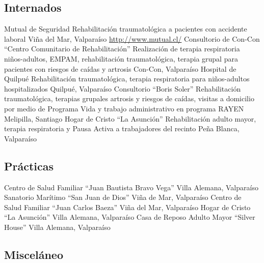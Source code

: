 \documentclass[11pt,a4paper,sans]{moderncv}
\begin{document}
\subsection{Internados}
        
        {Mutual de Seguridad}
        {Rehabilitación traumatológica a pacientes con accidente laboral}
        {}
        {Viña del Mar, Valparaíso}
        {\url{http://www.mutual.cl/}}
        {Consultorio de Con-Con ``Centro Comunitario de Rehabilitación''}
        {Realización de terapia respiratoria niños-adultos, EMPAM, rehabilitación traumatológica, terapia grupal para pacientes con riesgos de caídas y artrosis}
        {}
        {}
        {Con-Con, Valparaíso}
        {Hospital de Quilpué}
        {Rehabilitación traumatológica, terapia respiratoria para niños-adultos hospitalizados}
        {}
        {}
        {Quilpué, Valparaíso}
        {Consultorio ``Boris Soler''}
        {Rehabilitación traumatológica, terapias grupales artrosis y riesgos de caídas, visitas a domicilio por medio de Programa Vida y trabajo administrativo en programa RAYEN}
        {}
        {}
        {Melipilla, Santiago}
        {Hogar de Cristo ``La Asunción''}
        {Rehabilitación adulto mayor, terapia respiratoria y Pausa Activa a trabajadores del recinto}
        {}
        {}
        {Peña Blanca, Valparaíso}
        
\subsection{Prácticas}

\cventry{}
        {Centro de Salud Familiar ``Juan Bautista Bravo Vega''}
        {}
        {}
        {Villa Alemana, Valparaíso}
        {}
\cventry{}
        {Sanatorio Marítimo ``San Juan de Dios''}
        {}
        {}
        {Viña de Mar, Valparaíso}
        {}
\cventry{}
        {Centro de Salud Familiar ``Juan Carlos Baeza''}
        {}
        {}
        {Viña del Mar, Valparaíso}
        {}
\cventry{}
        {Hogar de Cristo ``La Asunción''}
        {}
        {}
        {Villa Alemana, Valparaíso}
        {}
\cventry{}
        {Casa de Reposo Adulto Mayor ``Silver House''}
        {}
        {}
        {Villa Alemana, Valparaíso}
        {}
        
        
\subsection{Misceláneo}
\end{document}
